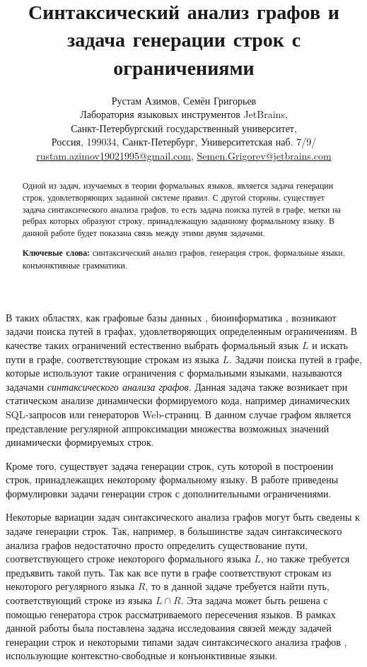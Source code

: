 \documentclass[10pt]{article}
\title{Синтаксический анализ графов и задача генерации строк с ограничениями}
\author{Рустам Азимов, Семён Григорьев \\ 
 Лаборатория языковых инструментов JetBrains, \\
 Санкт-Петербургский государственный университет, \\
 Россия, 199034, Санкт-Петербург, Университетская наб. 7/9/ \\ 
 \url {rustam.azimov19021995@gmail.com}, \url {Semen.Grigorev@jetbrains.com}
}
\date {}
\begin{document}
\maketitle

\begin{abstract}
Одной из задач, изучаемых в теории формальных языков, является задача генерации строк, удовлетворяющих заданной системе правил. С другой стороны, существует задача синтаксического анализа графов, то есть задача поиска путей в графе, метки на ребрах которых образуют строку, принадлежащую заданному формальному языку. В данной работе будет показана связь между этими двумя задачами.

\vspace{1em}
\textbf{Ключевые слова:} синтаксический анализ графов, генерация строк, формальные языки, конъюнктивные грамматики.

\end{abstract}

В таких областях, как графовые базы данных \cite{azimov-spbu-graphDB, azimov-spbu-zhang}, биоинформатика \cite{azimov-spbu-Anderson}, возникают задачи поиска путей в графах, удовлетворяющих определенным ограничениям. В качестве таких ограничений естественно выбрать формальный язык $L$ \cite{azimov-spbu-barrett} и искать пути в графе, соответствующие строкам из языка $L$. Задачи поиска путей в графе, которые используют такие ограничения с формальными языками, называются задачами \emph{синтаксического анализа графов}. Данная задача также возникает при статическом анализе динамически формируемого кода, например динамических SQL-запросов или генераторов Web-страниц. В данном случае графом является представление регулярной аппроксимации множества возможных значений динамически формируемых строк.

Кроме того, существует задача генерации строк, суть которой в построении строк, принадлежащих некоторому формальному языку. В работе \cite{azimov-spbu-Okhotin} приведены формулировки задачи генерации строк с дополнительными ограничениями.

Некоторые вариации задач синтаксического анализа графов могут быть сведены к задаче генерации строк. Так, например, в большинстве задач синтаксического анализа графов недостаточно просто определить существование пути, соответствующего строке некоторого формального языка $L$, но также требуется предъявить такой путь. Так как все пути в графе соответствуют строкам из некоторого регулярного языка $R$, то в данной задаче требуется найти путь, соответствующий строке из языка $L \cap R$. Эта задача может быть решена с помощью генератора строк рассматриваемого пересечения языков. В рамках данной работы была поставлена задача исследования связей между задачей генерации строк \cite{azimov-spbu-Okhotin} и некоторыми типами задач синтаксического анализа графов \cite{azimov-spbu-hellings1, azimov-spbu-hellings2}, использующие контекстно-свободные и конъюнктивные \cite{azimov-spbu-conj} языки.
\end{document}

